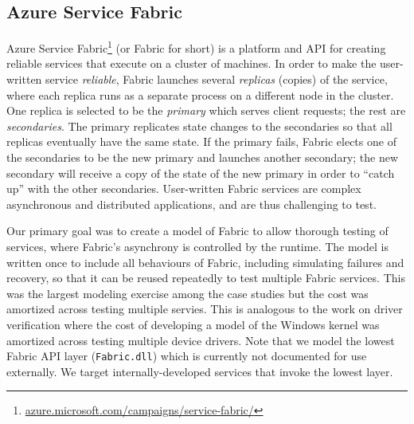 \subsection{Azure Service Fabric}
\label{sec:cases:fabric}

Azure Service Fabric\footnote{\url{azure.microsoft.com/campaigns/service-fabric/}} (or Fabric for short) is a platform and API for creating reliable services that execute on a cluster of machines. 
In order to make the user-written service \emph{reliable}, Fabric launches several \emph{replicas} (copies) of the service, where each replica runs as a separate process on a different node in the cluster.
One replica is selected to be the \emph{primary} which serves client requests; the rest are \emph{secondaries}. The primary replicates state changes to the secondaries 
so that all replicas eventually have the same state. 
If the primary fails,
Fabric elects one of the secondaries to be the new primary and launches another secondary; the new secondary will receive 
a copy
of the state of the new primary in order to ``catch up'' with the other secondaries. 
User-written Fabric services are complex asynchronous and distributed applications, and are thus challenging to test.

Our primary goal was to create a \psharp{} model of Fabric to allow
thorough testing of services, where Fabric's asynchrony is controlled 
by the \psharp{} runtime.
The model is written once
to include all behaviours of Fabric, including simulating failures and recovery,
so that it can be reused repeatedly to test multiple Fabric services.
This was the largest modeling exercise among the case studies but the cost
was amortized across testing multiple servies. This is analogous to the work
on driver verification \cite{ball2011slam} where the cost of developing a model
of the Windows kernel was amortized across testing multiple device drivers.
Note that we model the lowest Fabric API layer (\texttt{Fabric.dll})
which is currently not documented for use externally.
We target internally-developed services that invoke the lowest layer. 

